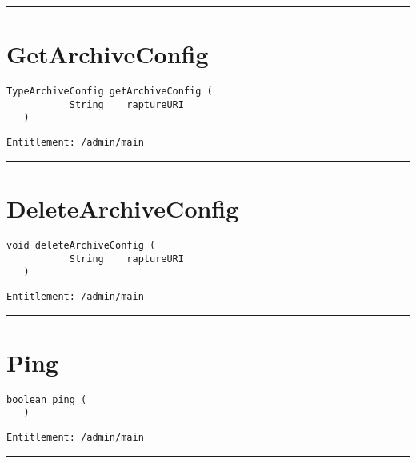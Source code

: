 \rule{12cm}{2pt}
\section{GetArchiveConfig}
\label{Api:GetArchiveConfig}
\begin{lstlisting}[style=nonumbers]
   TypeArchiveConfig getArchiveConfig (
           String    raptureURI
   )
\end{lstlisting}
\begin{Verbatim}[formatcom=\color{Maroon}]
  Entitlement: /admin/main
\end{Verbatim}



\rule{12cm}{2pt}
\section{DeleteArchiveConfig}
\label{Api:DeleteArchiveConfig}
\begin{lstlisting}[style=nonumbers]
   void deleteArchiveConfig (
           String    raptureURI
   )
\end{lstlisting}
\begin{Verbatim}[formatcom=\color{Maroon}]
  Entitlement: /admin/main
\end{Verbatim}



\rule{12cm}{2pt}
\section{Ping}
\label{Api:Ping}
\begin{lstlisting}[style=nonumbers]
   boolean ping (
   )
\end{lstlisting}
\begin{Verbatim}[formatcom=\color{Maroon}]
  Entitlement: /admin/main
\end{Verbatim}



\rule{12cm}{2pt}
